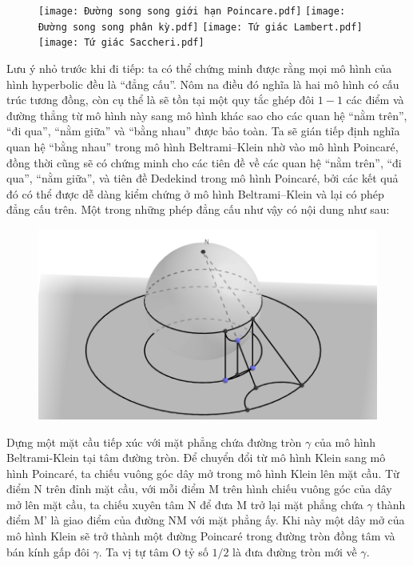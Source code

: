 	\begin{figure}[H]
		\vspace*{-5pt}
		\centering
		\captionsetup{labelformat= empty, justification=centering}
		\texttt{[image: Đường song song giới hạn Poincare.pdf]}
		\texttt{[image: Đường song song phân kỳ.pdf]}
		\texttt{[image: Tứ giác Lambert.pdf]}
		\texttt{[image: Tứ giác Saccheri.pdf]}
		\vspace*{-10pt}
	\end{figure}	
	Lưu ý nhỏ trước khi đi tiếp: ta có thể chứng minh được rằng mọi mô hình của hình hyperbolic đều là ``đẳng cấu''. Nôm na điều đó nghĩa là hai mô hình có cấu trúc tương đồng, còn cụ thể là sẽ tồn tại một quy tắc ghép đôi $1-1$ các điểm và đường thẳng từ mô hình này sang mô hình khác sao cho các quan hệ ``nằm trên'', ``đi qua'', ``nằm giữa'' và ``bằng nhau'' được bảo toàn. Ta sẽ gián tiếp định nghĩa quan hệ ``bằng nhau'' trong mô hình Beltrami--Klein nhờ vào mô hình Poincaré, đồng thời cũng sẽ có chứng minh cho các tiên đề về các quan hệ ``nằm trên'', ``đi qua'', ``nằm giữa'', và tiên đề Dedekind trong mô hình Poincaré, bởi các kết quả đó có thể được dễ dàng kiểm chứng ở mô hình Beltrami--Klein và lại có phép đẳng cấu trên. Một trong những phép đẳng cấu như vậy có nội dung như sau:
	

\begin{figure}[ht]
\includegraphics[width=\textwidth]{Klein_sang_Poincare.png}
\end{figure}

Dựng một mặt cầu tiếp xúc với mặt phẳng chứa đường tròn $\gamma$ của mô hình Beltrami-Klein tại tâm đường tròn. Để chuyển đổi từ mô hình Klein sang mô hình Poincar\'e, ta chiếu vuông góc dây mở trong mô hình Klein lên mặt cầu. Từ điểm N trên đỉnh mặt cầu, với mỗi điểm M trên hình chiếu vuông góc của dây mở lên mặt cầu, ta chiếu xuyên tâm N để đưa M trở lại mặt phẳng chứa $\gamma$ thành điểm M’ là giao điểm của đường NM với mặt phẳng ấy. Khi này một dây mở của mô hình Klein sẽ trở thành một đường Poincar\'e trong đường tròn đồng tâm và bán kính gấp đôi $\gamma$. Ta vị tự tâm O tỷ số $1/2$  là đưa đường tròn mới về $\gamma$.


